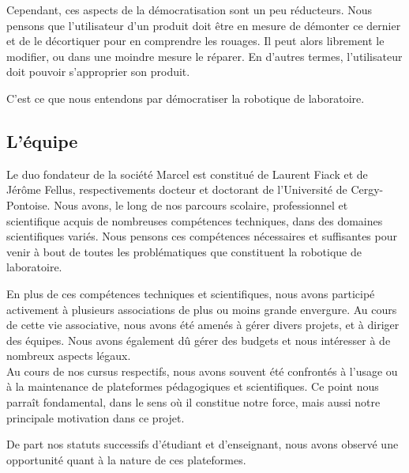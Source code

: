 \documentclass[a4paper,12pt]{report}
\begin{document}
Cependant, ces aspects de la démocratisation sont un peu réducteurs.
Nous pensons que l'utilisateur d'un produit doit être en mesure de démonter ce dernier et de le décortiquer pour en comprendre les rouages.
Il peut alors librement le modifier, ou dans une moindre mesure le réparer.
En d'autres termes, l'utilisateur doit pouvoir s'approprier son produit.

C'est ce que nous entendons par \og{}démocratiser la robotique de laboratoire\fg{}.

\subsection{L'équipe}
Le duo fondateur de la société Marcel est constitué de Laurent Fiack et de Jérôme Fellus, respectivements docteur et doctorant de l'Université de Cergy-Pontoise.
Nous avons, le long de nos parcours scolaire, professionnel et scientifique acquis de nombreuses compétences techniques, dans des domaines scientifiques variés. 
Nous pensons ces compétences nécessaires et suffisantes pour venir à bout de toutes les problématiques que constituent la robotique de laboratoire.

En plus de ces compétences techniques et scientifiques, nous avons participé activement à plusieurs associations de plus ou moins grande envergure.
Au cours de cette vie associative, nous avons été amenés à gérer divers projets, et à diriger des équipes.
Nous avons également dû gérer des budgets et nous intéresser à de nombreux aspects légaux.\\

Au cours de nos cursus respectifs, nous avons souvent été confrontés à l'usage ou à la maintenance de plateformes pédagogiques et scientifiques.
Ce point nous parraît fondamental, dans le sens où il constitue notre force, mais aussi notre principale motivation dans ce projet.

De part nos statuts successifs d'étudiant et d'enseignant, nous avons observé une opportunité quant à la nature de ces plateformes.


\end{document}
